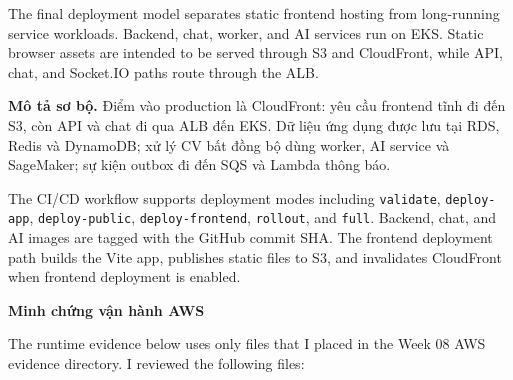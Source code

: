 The final deployment model separates static frontend hosting from
long-running service workloads. Backend, chat, worker, and AI services
run on EKS. Static browser assets are intended to be served through S3
and CloudFront, while API, chat, and Socket.IO paths route through the
ALB.

\textbf{Mô tả sơ bộ.} Điểm vào production là CloudFront: yêu cầu
frontend tĩnh đi đến S3, còn API và chat đi qua ALB đến EKS. Dữ liệu ứng
dụng được lưu tại RDS, Redis và DynamoDB; xử lý CV bất đồng bộ dùng
worker, AI service và SageMaker; sự kiện outbox đi đến SQS và Lambda
thông báo.

The CI/CD workflow supports deployment modes including
\texttt{validate}, \texttt{deploy-\allowbreak{}app}, \texttt{deploy-\allowbreak{}public},
\texttt{deploy-\allowbreak{}frontend}, \texttt{rollout}, and \texttt{full}. Backend,
chat, and AI images are tagged with the GitHub commit SHA. The frontend
deployment path builds the Vite app, publishes static files to S3, and
invalidates CloudFront when frontend deployment is enabled.

\vspace{0.5em}\noindent\textbf{Minh chứng vận hành
AWS}\par

The runtime evidence below uses only files that I placed in the Week 08
AWS evidence directory. I reviewed the following files:

